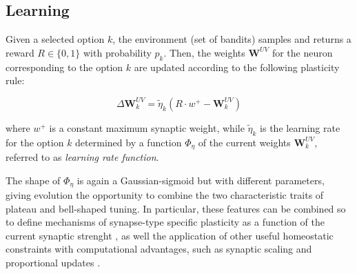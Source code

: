 \subsection{Learning}
Given a selected option $k$, the environment (set of bandits) samples and returns a reward $R\in \{0, 1\}$ with probability $p_{k}$.
Then, the weights $\textbf{W}^{UV}$ for the neuron corresponding to the option $k$ are updated according to the following plasticity rule:

\begin{equation}
    \Delta \textbf{W}^{UV}_{k} = \tilde{\eta}_{k} \left(R\cdot w^{+}- \textbf{W}^{UV}_{k}\right)
\end{equation}

\noindent where $w^{+}$ is a constant maximum synaptic weight, while $\tilde{\eta}_{k}$ is the learning rate for the option $k$ determined by a function $\Phi_{\eta}$ of the current weights $\textbf{W}^{UV}_{k}$, referred to as \textit{learning rate function}.

The shape of $\Phi_{\eta}$ is again a Gaussian-sigmoid but with different parameters, giving evolution the opportunity to combine the two characteristic traits of plateau and bell-shaped tuning.
In particular, these features can be combined so to define mechanisms of synapse-type specific plasticity as a function of the current synaptic strenght \cite{larsenSynapsetypespecificPlasticityLocal2015}, as well the application of other useful homeostatic constraints with computational advantages, such as synaptic scaling and proportional updates \cite{citriSynapticPlasticityMultiple2008, kennedySynapticSignalingLearning2016, samavatSynapticInformationStorage2024}.


